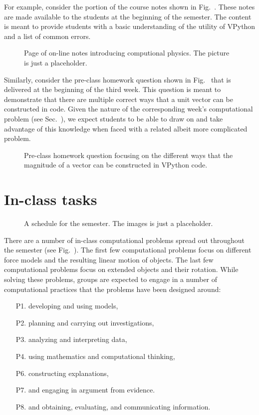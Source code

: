 \documentclass{msuphddissertation}
\begin{document}
\begin{doublespace}
For example, consider the portion of the course notes shown in Fig.~.  These notes are made available to the students at the beginning of the semester.  The content is meant to provide students with a basic understanding of the utility of VPython and a list of common errors.

\begin{figure}[ht]\centering
\caption{Page of on-line notes introducing computional physics.  The picture is just a placeholder.}
\end{figure} 

Similarly, consider the pre-class homework question shown in Fig.~ that is delivered at the beginning of the third week.  This question is meant to demonstrate that there are multiple correct ways that a unit vector can be constructed in code.  Given the nature of the corresponding week's computational problem (see Sec.~), we expect students to be able to draw on and take advantage of this knowledge when faced with a related albeit more complicated problem.

\begin{figure}[ht]\centering
\caption{Pre-class homework question focusing on the different ways that the magnitude of a vector can be constructed in VPython code.}
\end{figure} 

\section{In-class tasks}

\begin{figure}[ht]\centering
\caption{A schedule for the semester.  The images is just a placeholder.}
\end{figure}

There are a number of in-class computational problems spread out throughout the semester (see Fig.~).  The first few computational problems focus on different force models and the resulting linear motion of objects.  The last few computational problems focus on extended objects and their rotation.  While solving these problems, groups are expected to engage in a number of computational practices that the problems have been designed around: \begin{enumerate}
\item[P1.] developing and using models,
\item[P2.] planning and carrying out investigations,
\item[P3.] analyzing and interpreting data,
\item[P4.] using mathematics and computational thinking,
\item[P6.] constructing explanations,
\item[P7.] and engaging in argument from evidence.
\item[P8.] and obtaining, evaluating, and communicating information.
\end{enumerate}


\end{doublespace}
\end{document}
